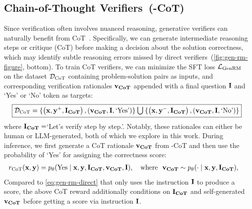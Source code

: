 \subsection{Chain-of-Thought Verifiers~(\genV-CoT)} 
\label{sec:cot-verifier}
Since verification often involves nuanced reasoning, generative verifiers can naturally benefit from CoT~\citep{wei2022chain}. Specifically, we can generate intermediate reasoning steps or critique (CoT) before making a decision about the solution correctness, which may identify subtle reasoning errors missed by direct verifiers~(\autoref{fig:gen-rm-figure}, bottom). To train CoT verifiers, we can minimize the SFT loss ${\mathcal{L}}_{{\text{GenRM}}}$ on the dataset ${\mathcal{D}}_{\text{CoT}}$ 
containing problem-solution pairs as inputs, and corresponding verification rationales ${\mathbf{v}}_{\textbf{CoT}}$ appended with a final question ${\mathbf{I}}$ and  `Yes' or `No' token as targets:
\begin{align*}
\boxed{
\gD_\text{CoT} = \{\left(\rvx, \rvy^+, \rmI_\cot\right), (\rvv_\cot, \rmI, \text{`Yes'})\} \union \{\left(\rvx, \rvy^-, \rmI_\cot\right), (\rvv_\cot, \rmI, \text{`No'})\}}
\end{align*}
where ${\mathbf{I}}_{\textbf{CoT}}=$`Let's verify step by step.'.
Notably, these rationales can either be human or LLM-generated, both of which we explore in this work. During inference, we first generate a CoT rationale ${\mathbf{v}}_{\textbf{CoT}}$ from \genV-CoT and then use the probability of `Yes' for assigning the correctness score:
\begin{align}
    r_{\text{CoT}}(\rvx, \rvy) &= p_{\theta}(\text{Yes} \mid \rvx, \rvy, \rmI_\cot, \rvv_\cot, \rmI),\quad \text{where}\ \ \rvv_{\textbf{CoT}} \sim p_{\theta}(\cdot \mid \rvx, \rvy, \rmI_\textbf{CoT}),
    \label{eq:cot-reward}
\end{align}
Compared to \eqref{eq:gen-rm-direct} that only uses the instruction ${\mathbf{I}}$ to produce a score, the above CoT reward additionally conditions on ${\mathbf{I}}_{\textbf{CoT}}$ and self-generated ${\mathbf{v}}_{\textbf{CoT}}$ before getting a score via instruction ${\mathbf{I}}$.


